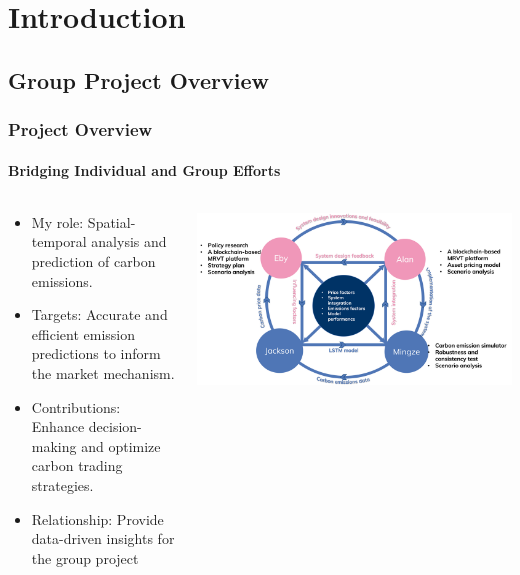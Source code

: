 \documentclass[light]{lutbeamer} %
\begin{document}
\section{Introduction}
\subsection{Group Project Overview}
\begin{frame}
    \frametitle{Project Overview}
    \framesubtitle{Bridging Individual and Group Efforts}
    \begin{columns}
        \begin{column}{0.4\textwidth}
            \begin{itemize}
                \item My role: \alert{Spatial-temporal analysis} and \alert{prediction} of carbon emissions.
                \item Targets: \alert{Accurate and efficient} emission predictions to inform the market mechanism.
                \item Contributions: Enhance \alert{decision-making} and optimize carbon \alert{trading strategies}.
                \item Relationship: Provide \alert{data-driven insights} for the group project
            \end{itemize}
        \end{column}
    \end{columns}
\end{frame}
\end{document}
